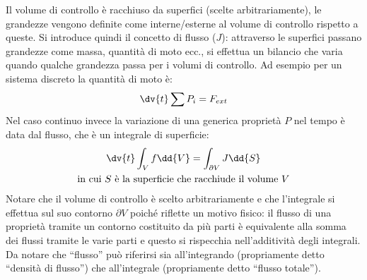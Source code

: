 %
Il volume di controllo è racchiuso da superfici (scelte arbitrariamente), le grandezze vengono definite come interne/esterne al volume di controllo rispetto a queste.
Si introduce quindi il concetto di flusso ($J$): attraverso le superfici passano grandezze come massa, quantità di moto ecc., si effettua un bilancio che varia quando qualche grandezza passa per i volumi di controllo.
Ad esempio per un sistema discreto la quantità di moto è:
%
	\begin{equation*}
		\dv{t} \sum{P_i} = F_{ext} 
	\end{equation*}
%
Nel caso continuo invece la variazione di una generica proprietà $P$ nel tempo è data dal flusso, che è un integrale di superficie:
%
	\begin{equation*}
		\begin{gathered}
			\dv{t} \int_V{f \dd{V}} = \int_{\partial{V}} {J \dd{S}} \\
			 \text{in cui $S$ è la superficie che racchiude il volume $V$}
		\end{gathered}
	\end{equation*}
%
Notare che il volume di controllo è scelto arbitrariamente e che l'integrale si effettua sul suo contorno $\partial V$ poiché riflette un motivo fisico: il flusso di una proprietà tramite un contorno costituito da più parti è equivalente alla somma dei flussi tramite le varie parti e questo si rispecchia nell'additività degli integrali.
Da notare che ``flusso'' può riferirsi sia all'integrando (propriamente detto ``densità di flusso'') che all'integrale (propriamente detto ``flusso totale'').
%
